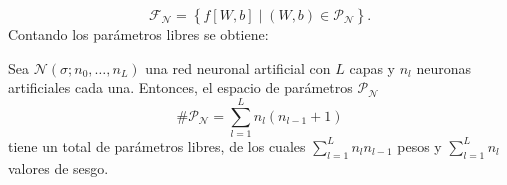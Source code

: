\begin{frame}
\begin{equation*}
        \mathcal{F}_{\mathcal{N}}=
        \left\{f\left[W,b\right]\mid \left(W,b\right)\in\mathcal{P}_{\mathcal{N}}\right\}.
    \end{equation*}
    Contando los parámetros libres se obtiene:
    \begin{corollary}
        Sea $\mathcal{N}\left(\sigma;n_{0},\dotsc,n_{L}\right)$ una red
        neuronal artificial con $L$ capas y $n_{l}$ neuronas artificiales
        cada una.
        Entonces, el espacio de parámetros $\mathcal{P}_{\mathcal{N}}$
        \vspace*{-.5\baselineskip}\setlength\belowdisplayshortskip{0pt}
        \begin{equation*}
            \#\mathcal{P}_{\mathcal{N}}=
            \sum_{l=1}^{L}
            n_{l}\left(n_{l-1}+1\right)
        \end{equation*}
        tiene un total de parámetros libres, de los cuales
        $\sum_{l=1}^{L}n_{l}n_{l-1}$ pesos y $\sum_{l=1}^{L}n_{l}$
        valores de sesgo.
    \end{corollary}
\end{frame}

